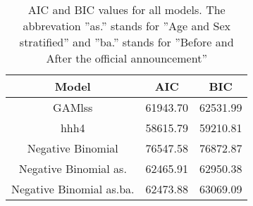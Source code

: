 \begin{table}[ht]
\centering
\begin{tabular}{ccc}
  \hline
Model & AIC & BIC \\ 
  \hline
GAMlss & 61943.70 & 62531.99 \\ 
  hhh4 & 58615.79 & 59210.81 \\ 
  Negative Binomial  & 76547.58 & 76872.87 \\ 
  Negative Binomial as. & 62465.91 & 62950.38 \\ 
  Negative Binomial as.ba. & 62473.88 & 63069.09 \\ 
   \hline
\end{tabular}
\caption{AIC and BIC values for all models.
The abbrevation ''as.'' stands for ''Age and Sex stratified'' and ''ba.''
stands for ''Before and After the official announcement''} 
\label{TabelMods}
\end{table}
